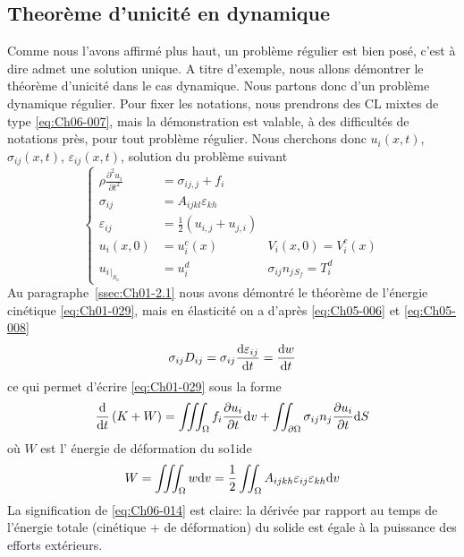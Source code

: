 \subsection{Theorème d'unicité en dynamique}
Comme nous l'avons affirmé plus haut, un problème régulier est bien 
posé, c'est à dire admet une solution unique.
A titre d'exemple, nous allons démontrer le théorème d'unicité dans le cas dynamique.
Nous partons donc d'un problème dynamique régulier.
Pour fixer les notations, nous prendrons des CL mixtes de type \eqref{eq:Ch06-007}, mais la démonstration est valable, à des difficultés de notations près, pour tout problème régulier.
Nous cherchons donc $u_i\left( x,t \right)$, $\sigma_{ij}\left( x,t \right)$, $\varepsilon_{ij}\left( x,t \right)$, solution du problème suivant
\begin{equation}
    \left\{
    \begin{aligned}
        \rho \frac{\partial^2 u_i}{\partial t^2} &= \sigma_{ij,j} + f_i \\
        \sigma_{ij} &= A_{ijkl} \varepsilon_{kh} \\
        \varepsilon_{ij} &= \frac{1}{2} \left( u_{i,j} + u_{j,i} \right) \\
        u_i \left( x,0 \right) &= u_i^c \left( x \right) \quad & V_i\left( x,0 \right) = V_i^c\left( x \right) \\
        u_i{}_{|_{S_u}} &= u_i^d  \quad & \sigma_{ij} n_j{}_{S_f} = T_i^d
    \end{aligned}
    \right.
    \label{eq:Ch06-012}
\end{equation}
Au paragraphe~\ref{ssec:Ch01-2.1} nous avons démontré le théorème de l'énergie cinétique \eqref{eq:Ch01-029}, mais en élasticité on a d'après \eqref{eq:Ch05-006} et \eqref{eq:Ch05-008}
\begin{equation}
    \sigma_{ij} D_{ij} = \sigma_{ij} \frac{\mathrm{d} \varepsilon_{ij}}{\mathrm{d} t} = \frac{\mathrm{d} w}{\mathrm{d} t}
    \label{eq:Ch06-013}
\end{equation}
ce qui permet d'écrire \eqref{eq:Ch01-029} sous la forme
\begin{equation}
    \frac{\mathrm{d}}{\mathrm{d} t} \left( K + W \right) = \iiint_{\Omega} f_i \frac{\partial u_i}{\partial t} \mathrm{d} v + \iint_{\partial \Omega} \sigma_{ij} n_j \frac{\partial u_i}{\partial t} \mathrm{d} S
    \label{eq:Ch06-014}
\end{equation}
où $W$ est l' énergie de déformation du so1ide
\begin{equation}
    W = \iiint_{\Omega} w \mathrm{d} v = \frac{1}{2} \iint_{\Omega} A_{ijkh} \varepsilon_{ij} \varepsilon_{kh} \mathrm{d} v
    \label{eq:Ch06-015}
\end{equation}
La signification de \eqref{eq:Ch06-014} est claire: la dérivée par rapport au temps de l'énergie totale (cinétique + de déformation) du solide est égale à la puissance des efforts extérieurs.

